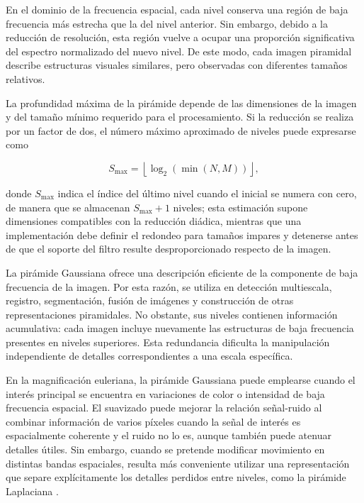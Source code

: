 En el dominio de la frecuencia espacial, cada nivel conserva una región de baja frecuencia más estrecha que la del nivel anterior. Sin embargo, debido a la reducción de resolución, esta región vuelve a ocupar una proporción significativa del espectro normalizado del nuevo nivel. De este modo, cada imagen piramidal describe estructuras visuales similares, pero observadas con diferentes tamaños relativos.

La profundidad máxima de la pirámide depende de las dimensiones de la imagen y del tamaño mínimo requerido para el procesamiento. Si la reducción se realiza por un factor de dos, el número máximo aproximado de niveles puede expresarse como

\begin{equation}
    S_{\max}
    =
    \left\lfloor
        \log_2
        \left(
            \min(N,M)
        \right)
    \right\rfloor,
    \label{eq:niveles_maximos_gaussianos}
\end{equation}

donde $S_{\max}$ indica el índice del último nivel cuando el inicial se numera con cero, de manera que se almacenan $S_{\max}+1$ niveles; esta estimación supone dimensiones compatibles con la reducción diádica, mientras que una implementación debe definir el redondeo para tamaños impares y detenerse antes de que el soporte del filtro resulte desproporcionado respecto de la imagen.

La pirámide Gaussiana ofrece una descripción eficiente de la componente de baja frecuencia de la imagen. Por esta razón, se utiliza en detección multiescala, registro, segmentación, fusión de imágenes y construcción de otras representaciones piramidales. No obstante, sus niveles contienen información acumulativa: cada imagen incluye nuevamente las estructuras de baja frecuencia presentes en niveles superiores. Esta redundancia dificulta la manipulación independiente de detalles correspondientes a una escala específica.

En la magnificación euleriana, la pirámide Gaussiana puede emplearse cuando el interés principal se encuentra en variaciones de color o intensidad de baja frecuencia espacial. El suavizado puede mejorar la relación señal-ruido al combinar información de varios píxeles cuando la señal de interés es espacialmente coherente y el ruido no lo es, aunque también puede atenuar detalles útiles. Sin embargo, cuando se pretende modificar movimiento en distintas bandas espaciales, resulta más conveniente utilizar una representación que separe explícitamente los detalles perdidos entre niveles, como la pirámide Laplaciana \cite{wu2012eulerian}.

